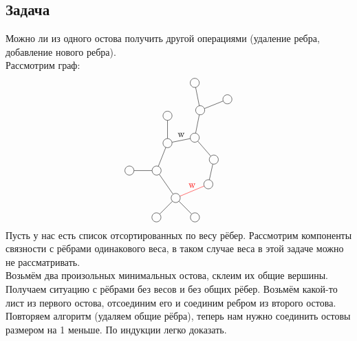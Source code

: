\documentclass[12pt, a4paper]{article}
\begin{document}
    \subsection*{Задача}
    Можно ли из одного остова получить другой операциями (удаление ребра, добавление нового ребра).\\
    Рассмотрим граф: 
    \[\begin{tikzpicture}[every circle node/.style={circle, draw}]
        \draw (0, 0) node[circle](0){};
        \draw (0.2, -1) node[circle](1){};
        \draw (1.2, -0.6) node[circle](2){};
        \draw (0) -- (1);
        \draw (1) -- (2);
        \draw (0, -2) node[circle](3){};
        \draw (1) -- (3);
        \draw (-1, -2.2) node[circle](4){};
        \draw (3) -- node[anchor=south]{w} (4);
        \draw (-1.4, -3.2) node[circle](5){};
        \draw (4) -- (5);
        \draw (-0.7, -4.2) node[circle](6){};
        \draw (5) -- (6);
        \draw (0.5, -3.7) node[circle](7){};
        \draw[red] (6) -- node[anchor=south]{w} (7); 
        \draw (0.7, -2.8) node[circle](8){};
        \draw (7) -- (8);
        \draw (3) -- (8);
        \draw node[above of=4][circle](9){};
        \draw (4) -- (9);
        \draw node[left of=5][circle](10){};
        \draw (5) -- (10);
        \draw node[below left of=6][circle](11){};
        \draw (6) -- (11);
        \draw node[below right of=6][circle](12){};
        \draw (6) -- (12);
    \end{tikzpicture}\]
    Пусть у нас есть список отсортированных по весу рёбер. Рассмотрим компоненты связности с рёбрами одинакового веса, в таком случае веса в этой задаче можно не рассматривать.\\
    Возьмём два произольных минимальных остова, склеим их общие вершины.\\
    Получаем ситуацию с рёбрами без весов и без общих рёбер. Возьмём какой-то лист из первого остова, отсоединим его и соединим ребром из второго остова. Повторяем алгоритм (удаляем общие рёбра), теперь нам нужно соединить остовы размером на 1 меньше. По индукции легко доказать.
    
\end{document}
